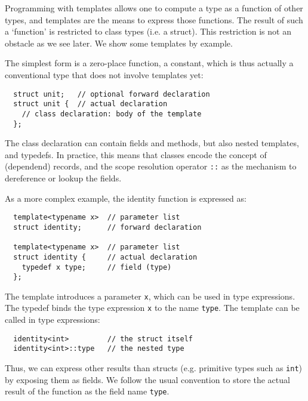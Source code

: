 \documentclass{llncs}
\begin{document}
  Programming with templates allows one to compute a type as a function
  of other types, and templates are the means to express those functions.
  The result of such a `function' is restricted to class
  types (i.e. a struct). This restriction is not an obstacle as we see
  later. We show some templates by example.

  The simplest form is a zero-place function, a constant, which
  is thus actually a conventional type that does not involve
  templates yet:
  \begin{lstlisting}
  struct unit;   // optional forward declaration
  struct unit {  // actual declaration
    // class declaration: body of the template
  };
  \end{lstlisting}
  The class declaration can contain fields and methods, but also
  nested templates, and typedefs. In practice, this means that
  classes encode the concept of (dependend) records, and the
  scope resolution operator \lstinline$::$ as the mechanism
  to dereference or lookup the fields.

  As a more complex example, the identity function is expressed as:
  \begin{lstlisting}
  template<typename x>  // parameter list
  struct identity;      // forward declaration

  template<typename x>  // parameter list
  struct identity {     // actual declaration
    typedef x type;     // field (type)
  };
  \end{lstlisting}
  The template introduces a parameter \lstinline$x$, which can
  be used in type expressions. The typedef binds the type
  expression \lstinline$x$ to the name \lstinline$type$.
  The template can be called in type expressions:
  \begin{lstlisting}
  identity<int>         // the struct itself
  identity<int>::type   // the nested type
  \end{lstlisting}
  Thus, we can express other results than structs (e.g. primitive
  types such as \lstinline$int$) by exposing them as fields.
  We follow the usual convention to store the actual result of the
  function as the field name \lstinline$type$.
\end{document}
